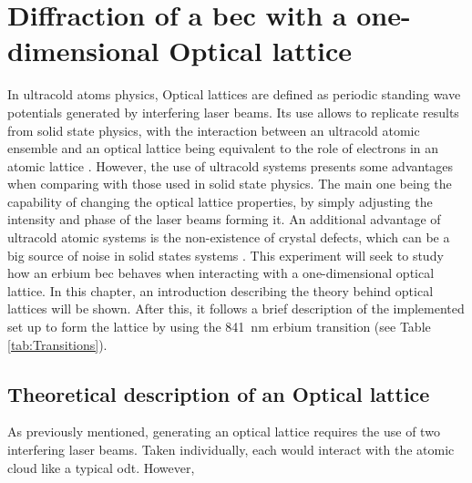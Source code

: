 
\chapter{Diffraction of a \acl{bec} with a one-dimensional Optical lattice}
\label{chap:one_dimensional_lattices}
In ultracold atoms physics, Optical lattices are defined as periodic standing wave potentials generated by interfering laser beams. Its use allows to replicate results from solid state physics, with the interaction between an ultracold atomic ensemble and an optical lattice being equivalent to the role of electrons in an atomic lattice \cite{Lewenstein2007, Bloch2008}.  However, the use of ultracold systems presents some advantages when comparing with those used in solid state physics. The main one being the capability of changing the optical lattice properties, by simply adjusting the intensity and phase of the laser beams forming it. An additional advantage of ultracold atomic systems is the non-existence of crystal defects, which can be a big source of noise in solid states systems \cite{VanDerZiel1978}. This experiment will seek to study how an erbium \ac{bec} behaves when interacting with a one-dimensional optical lattice. In this chapter, an introduction describing the theory behind optical lattices will be shown. After this, it follows a brief description of the implemented set up to form the lattice by using the \SI{841}{\nano\meter} erbium transition (see Table \ref{tab:Transitions}).

\section{Theoretical description of an Optical lattice}

As previously mentioned, generating an optical lattice requires the use of two interfering laser beams. Taken individually, each would interact with the atomic cloud like a typical \acf{odt}. However, 

